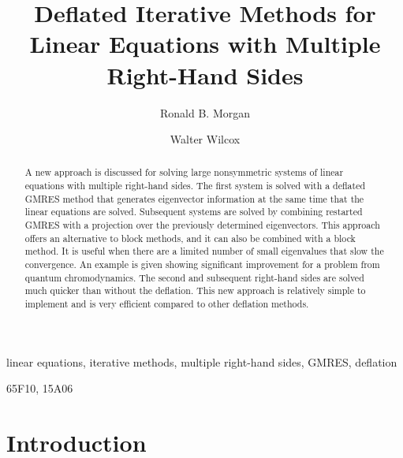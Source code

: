 \documentclass[final]{siamltex}
\title{Deflated Iterative Methods for Linear Equations with Multiple
Right-Hand Sides\footnotemark[1]}
\author{Ronald B. Morgan\footnotemark[2]
\and Walter Wilcox\footnotemark[3] }
\begin{document}


\maketitle


\begin{abstract}
A new approach is discussed for solving large nonsymmetric systems of linear equations with multiple right-hand sides.  The first system is
solved with a deflated GMRES method that generates eigenvector information
at the same time that the linear equations are solved.  Subsequent systems
are solved by combining restarted GMRES with a projection over the previously determined eigenvectors.  This approach offers an alternative to block methods, and it can also be combined with a block method.  It is useful when there are a limited number of small eigenvalues that slow the convergence.  An example is given showing significant improvement for a problem from quantum chromodynamics.  The second and subsequent right-hand sides are solved much quicker than without the deflation.  This new approach is relatively simple to implement and is very efficient compared to other deflation methods.
\end{abstract}

\begin{keywords} 
 linear equations, iterative methods, multiple right-hand sides, GMRES, deflation
\end{keywords}

\begin{AMS}
65F10, 15A06
\end{AMS}

\pagestyle{myheadings}
\thispagestyle{plain}

\section{Introduction}
\end{document}

